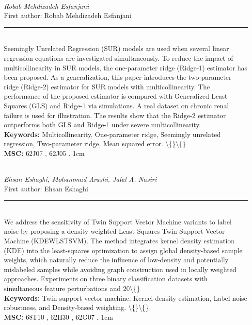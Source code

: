 \documentclass[10pt,twoside]{article}
\begin{document}
\noindent\begin{minipage}[t][\textheight]{\textwidth}
\\[0.35em]
{\itshape Robab Mehdizadeh Esfanjani}\\[0.2em]
{\footnotesize First author: Robab Mehdizadeh Esfanjani}\\[0.45em]
\noindent\rule{\textwidth}{0.3pt}\\[0.4em]
{\footnotesize  Seemingly Unrelated Regression (SUR) models are used when several linear regression equations are investigated simultaneously. To reduce the impact of multicollinearity in SUR models, the one-parameter ridge (Ridge-1) estimator has been proposed. As a generalization, this paper introduces the two-parameter ridge (Ridge-2) estimator for SUR models with multicollinearity. The performance of the proposed estimator is compared with Generalized Least Squares (GLS) and Ridge-1 via simulations. A real dataset on chronic renal failure is used for illustration. The results show that the Ridge-2 estimator outperforms both GLS and Ridge-1 under severe multicollinearity.}\\[0.4em]
{\footnotesize\bfseries Keywords:} {\footnotesize Multicollinearity, One-parameter ridge, Seemingly unrelated regression, Two-parameter ridge, Mean squared error. \textbackslash\{\}\textbackslash\{\}}\\[0.15em]
{\footnotesize\bfseries MSC:} {\footnotesize 62J07 , 62J05 . 1cm}\\
\vfill
\end{minipage}
\newpage

\noindent\begin{minipage}[t][\textheight]{\textwidth}
\\[0.35em]
{\itshape Ehsan Eshaghi, Mohammad Arashi, Jalal A. Nasiri}\\[0.2em]
{\footnotesize First author: Ehsan Eshaghi}\\[0.45em]
\noindent\rule{\textwidth}{0.3pt}\\[0.4em]
{\footnotesize  We address the sensitivity of Twin Support Vector Machine variants to label noise by proposing a density-weighted Least Squares Twin Support Vector Machine (KDEWLSTSVM). The method integrates kernel density estimation (KDE) into the least-squares optimization to assign global density-based sample weights, which naturally reduce the influence of low-density and potentially mislabeled samples while avoiding graph construction used in locally weighted approaches. Experiments on three binary classification datasets with simultaneous feature perturbations and 20\textbackslash\{\}}\\[0.4em]
{\footnotesize\bfseries Keywords:} {\footnotesize Twin support vector machine, Kernel density estimation, Label noise robustness, and Density-based weighting. \textbackslash\{\}\textbackslash\{\}}\\[0.15em]
{\footnotesize\bfseries MSC:} {\footnotesize 68T10 , 62H30 , 62G07 . 1cm}\\
\vfill
\end{minipage}
\newpage
\end{document}
